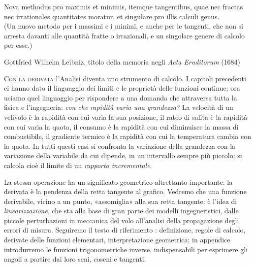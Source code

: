 
\epigraph{Nova methodus pro maximis et minimis, itemque tangentibus, quae nec fractas
nec irrationales quantitates moratur, et singulare pro illis calculi genus.\\[2pt]
\upshape(Un nuovo metodo per i massimi e i minimi, e anche per le tangenti, che non si
arresta davanti alle quantità fratte o irrazionali, e un singolare genere di calcolo per
esse.)}{Gottfried Wilhelm Leibniz, titolo della memoria negli \emph{Acta Eruditorum}
(1684)}

\lettrine[lines=3, findent=2pt, nindent=0pt]{C}{on la derivata} l'Analisi diventa uno
strumento di calcolo. I capitoli precedenti ci hanno dato il linguaggio dei limiti e le
proprietà delle funzioni continue; ora usiamo quel linguaggio per rispondere a una
domanda che attraversa tutta la fisica e l'ingegneria: \emph{con che rapidità varia una
grandezza?} La velocità di un velivolo è la rapidità con cui varia la sua posizione,
il rateo di salita è la rapidità con cui varia la quota, il consumo è la rapidità con
cui diminuisce la massa di combustibile, il gradiente termico è la rapidità con cui la
temperatura cambia con la quota. In tutti questi casi si confronta la variazione della
grandezza con la variazione della variabile da cui dipende, in un intervallo sempre più
piccolo: si calcola cioè il limite di un \emph{rapporto incrementale}.

La stessa operazione ha un significato geometrico altrettanto importante: la derivata è
la pendenza della retta tangente al grafico. Vedremo che una funzione derivabile, vicino
a un punto, «assomiglia» alla sua retta tangente: è l'idea di \emph{linearizzazione},
che sta alla base di gran parte dei modelli ingegneristici, dalle piccole perturbazioni
in meccanica del volo all'analisi della propagazione degli errori di misura. Seguiremo
il testo di riferimento \cite{marcellini-sbordone}: definizione, regole di calcolo,
derivate delle funzioni elementari, interpretazione geometrica; in appendice
introdurremo le funzioni trigonometriche inverse, indispensabili per esprimere gli
angoli a partire dai loro seni, coseni e tangenti.

